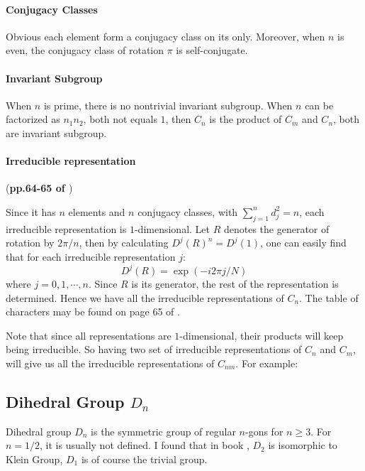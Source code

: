 \paragraph{Conjugacy Classes} Obvious each element form a conjugacy
class on its only. Moreover, when $n$ is even, the conjugacy class of
rotation $\pi$ is self-conjugate.

\paragraph{Invariant Subgroup} When $n$ is prime, there is no
nontrivial invariant subgroup. When $n$ can be factorized as $n_1n_2$,
both not equals $1$, then $C_n$ is the product of $C_m$ and $C_n$,
both are invariant subgroup.

\paragraph{Irreducible representation} (\textbf{pp.64-65 of \cite{book}})

Since it has $n$ elements and $n$ conjugacy classes, with
$\sum_{j=1}^n d_j^2 = n$, each irreducible representation is
$1$-dimensional. Let $R$ denotes the generator of rotation by
$2\pi/n$, then by calculating $D^j(R)^n=D^j(1)$, one can easily find
that for each irreducible representation $j$:
\begin{equation}
    D^j(R) = \exp(-i2\pi j/N)
\end{equation}
where $j=0,1,\cdots, n$. Since $R$ is its generator, the rest of the
representation is determined. Hence we have all the irreducible
representations of $C_n$. The table of characters may be found on page
65 of \cite{book}.

Note that since all representations are $1$-dimensional, their
products will keep being irreducible. So having two set of irreducible
representations of $C_n$ and $C_m$, will give us all the irreducible
representations of $C_{nm}$. For example:

\subsection{Dihedral Group \texorpdfstring{$D_n$}{}}
\label{sec:Dihedral-Group}
\begin{defi}
    Dihedral group $D_n$ is the symmetric group of regular $n$-gons
    for $n\geq 3$. For $n=1/2$, it is usually not defined. I found that
    in book \cite{book}, $D_2$ is isomorphic to Klein Group, $D_1$ is
    of course the trivial group.
\end{defi}

